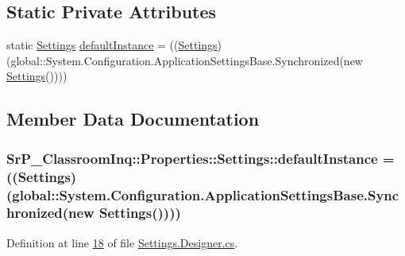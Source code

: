 \subsection*{\-Static \-Private \-Attributes}
\begin{DoxyCompactItemize}
\item 
static \hyperlink{class_sr_p___classroom_inq_1_1_properties_1_1_settings}{\-Settings} \hyperlink{class_sr_p___classroom_inq_1_1_properties_1_1_settings_a0a71ce7c79440c1532000746426ccf1f}{default\-Instance} = ((\hyperlink{class_sr_p___classroom_inq_1_1_properties_1_1_settings}{\-Settings})(global\-::\-System.\-Configuration.\-Application\-Settings\-Base.\-Synchronized(new \hyperlink{class_sr_p___classroom_inq_1_1_properties_1_1_settings}{\-Settings}())))
\end{DoxyCompactItemize}


\subsection{\-Member \-Data \-Documentation}
\hypertarget{class_sr_p___classroom_inq_1_1_properties_1_1_settings_a0a71ce7c79440c1532000746426ccf1f}{
\subsubsection[{default\-Instance}]{ {\bf \-Sr\-P\-\_\-\-Classroom\-Inq\-::\-Properties\-::\-Settings\-::default\-Instance} = (({\bf \-Settings})(global\-::\-System.\-Configuration.\-Application\-Settings\-Base.\-Synchronized(new {\bf \-Settings}())))}}
\label{class_sr_p___classroom_inq_1_1_properties_1_1_settings_a0a71ce7c79440c1532000746426ccf1f}


\-Definition at line \hyperlink{_settings_8_designer_8cs_source_l00018}{18} of file \hyperlink{_settings_8_designer_8cs_source}{\-Settings.\-Designer.\-cs}.



